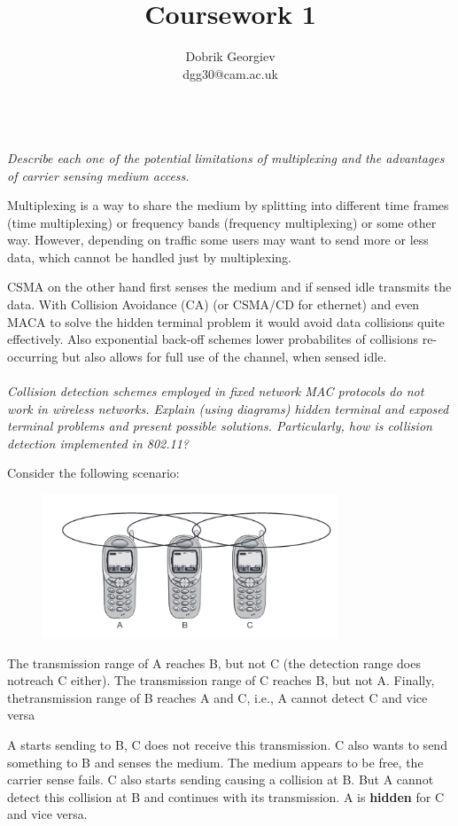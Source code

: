 \documentclass[12pt]{article}
\title{Coursework 1}
\author{Dobrik Georgiev \\ \small dgg30@cam.ac.uk}
\newcommand*\circled[1]{\tikz[baseline=(char.base)]{
		\node[shape=circle,draw,inner sep=0pt] (char) {#1};}}
\begin{document}
\maketitle
~\\
\textit{\circled{1.} Describe each one of the potential limitations of multiplexing
and the advantages of carrier sensing medium access.}

Multiplexing is a way to share the medium by splitting into different time
frames (time multiplexing) or frequency bands (frequency multiplexing) or some
other way. However, depending on traffic some users may want to send more or
less data, which cannot be handled just by multiplexing.

CSMA on the other hand first senses the medium and if sensed idle transmits the
data. With Collision Avoidance (CA) (or CSMA/CD for ethernet) and even MACA to
solve the hidden terminal problem it would avoid data collisions quite
effectively. Also exponential back-off schemes lower probabilites of collisions
re-occurring but also allows for full use of the channel, when sensed idle.
\\
\\
\textit{\circled{2.} Collision detection schemes employed in fixed network MAC protocols do not work in wireless
networks. Explain (using diagrams) hidden terminal and exposed terminal problems and present
possible solutions. Particularly, how is collision detection implemented in 802.11?}

Consider the following scenario:
\begin{figure}[H]
    \centering
    \includegraphics[width=250pt]{hidden_terminal.png}
\end{figure}
The transmission range of A reaches B, but not C (the detection range does
notreach C either). The transmission range of C reaches B, but not A. Finally,
thetransmission range of B reaches A and C, i.e., A cannot detect C and vice
versa

A starts sending to B, C does not receive this transmission. C also wants
to send something to B and senses the medium. The medium appears to be free, the
carrier sense fails. C also starts sending causing a collision at B. But
A cannot detect this collision at B and continues with its transmission. A is
\textbf{hidden} for C and vice versa.
\end{document}
